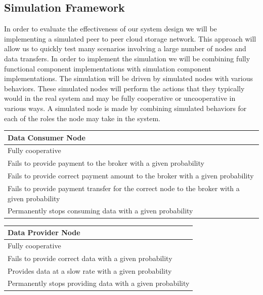 \documentclass[%
				10pt,
        final,
        notitlepage,
        narroweqnarray,
        inline,
        twoside,
        ]{ieee}
\begin{document}
\subsection{Simulation Framework}
In order to evaluate the effectiveness of our system design we will be implementing a simulated peer to peer cloud storage network.  This approach will allow us to quickly test many scenarios involving a large number of nodes and data transfers.  In order to implement the simulation we will be combining fully functional component implementations with simulation component implementations.  The simulation will be driven by simulated nodes with various behaviors.  These simulated nodes will perform the actions that they typically would in the real system and may be fully cooperative or uncooperative in various ways.  A simulated node is made by combining simulated behaviors for each of the roles the node may take in the system.

\begin{center}
  \begin{tabular}{ p{6.25cm} }
    \bf Data Consumer Node \\ \hline
    \hline
    Fully cooperative \\ \hline
    Fails to provide payment to the broker with a given probability \\ \hline
    Fails to provide correct payment amount to the broker with a given probability \\ \hline
    Fails to provide payment transfer for the correct node to the broker with a given probability \\ \hline
    Permanently stops consuming data with a given probability \\
    \hline
  \end{tabular}
\end{center}

\begin{center}
  \begin{tabular}{ p{6.25cm} }
    \bf Data Provider Node \\ \hline
    \hline
    Fully cooperative \\ \hline
    Fails to provide correct data with a given probability \\ \hline
    Provides data at a slow rate with a given probability \\ \hline
    Permanently stops providing data with a given probability \\ \hline
  \end{tabular}
\end{center}
\end{document}
